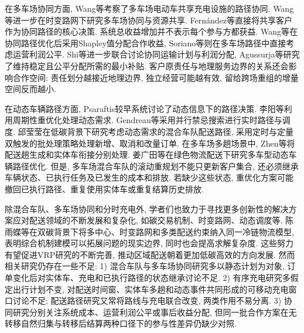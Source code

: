 \documentclass{setp-new}
\begin{document}
在多车场协同方面, Wang等\cite{ref:7}考察了多车场电动车共享充电设施的路径协同.
Wang等\cite{ref:25}进一步在时变路网下研究多车场协同与资源共享.
Fern\'{a}ndez等\cite{ref:49}直接将共享客户作为协同路径的核心决策.
系统总收益增加并不表示每个参与方都获益.
Wang等\cite{ref:7}在协同路径优化后采用Shapley值分配合作收益,
Soriano等\cite{ref:8}则在多车场路径中直接考虑运营利润公平.
Shi等\cite{ref:9}进一步联合讨论协同运输计划与利润分配,
Agussurja等\cite{ref:10}研究了维持稳定且公平分配所需的最小补贴.
客户原责任与地理服务边界的关系还会影响合作空间:
责任划分越接近地理边界, 独立经营可能越有效,
留给跨场重组的增量空间反而越小.

在动态车辆路径方面, Psaraftis\cite{ref:14}较早系统讨论了动态信息下的路径决策.
李阳等\cite{ref:18}利用周期性重优化处理动态需求.
Gendreau等\cite{ref:22}采用并行禁忌搜索进行实时路径与调度.
邱莹莹\cite{ref:71}在低碳背景下研究考虑动态需求的混合车队配送路径,
采用定时与定量双触发的批处理策略处理新增、取消和改量订单.
在多车场多趟场景中, Zhen等\cite{ref:44}将配送趟生成和实体车衔接分别处理.
姜广田等\cite{ref:51}在绿色物流配送下研究多车型动态车辆路径优化.
但是, 多车场混合车队的滚动重规划不能只更新客户集合,
还必须继承车辆状态、已执行任务及已发生的成本和排放.
若缺少这些状态, 重优化方案可能撤回已执行路径、重复使用实体车或重复结算历史排放.

除混合车队、多车场协同和分时充电外,
学者们也致力于寻找更多创新性的解决方案应对配送领域的不断发展和复杂化,
如碳交易机制、时变路网、动态调度等.
陈雨蝶等\cite{ref:48}在双碳背景下将多中心、时变路网和多类配送约束纳入同一冷链物流模型,
表明综合机制建模可以拓展问题的现实边界, 同时也会提高求解复杂度.
这些努力有望促进VRP研究的不断完善, 推动区域配送朝着更加低碳高效的方向发展.
然而相关研究仍存在一些不足:
1) 混合车队与多车场协同研究多以静态计划为对象,
订单变化后对实体车、充电和已执行路径的状态继承讨论不足.
2) 有序充电研究多假定出行计划不变,
对配送时间窗、实体车多趟和动态事件共同形成的可移动充电窗口讨论不足;
配送路径研究又常将路线与充电联合改变, 两类作用不易分离.
3) 协同研究分别关注系统成本、运营利润公平或事后收益分配,
但同一批合作方案在无转移自然归集与转移后结算两种口径下的参与性差异仍缺少对照.
\end{document}
